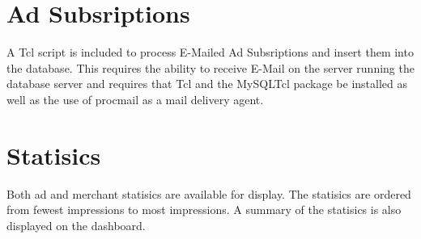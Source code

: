 \documentclass[letterpaper]{article}
\begin{document}
\section{Ad Subsriptions}

A Tcl script is included to process E-Mailed Ad Subsriptions and
insert them into the database.  This requires the ability to receive
E-Mail on the server running the database server and requires that Tcl
and the MySQLTcl package be installed as well as the use of procmail as
a mail delivery agent.

\section{Statisics}

Both ad and merchant statisics are available for display.  The
statisics are ordered from fewest impressions to most impressions. A
summary of the statisics is also displayed on the dashboard.
\end{document}
